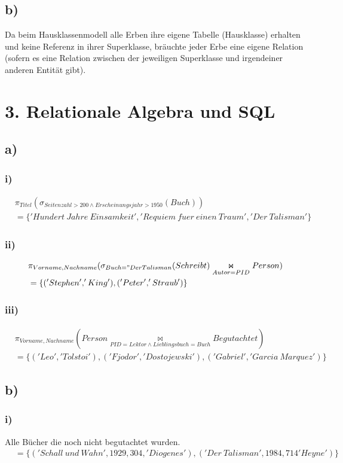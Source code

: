 \documentclass[11pt,german]{article}
\begin{document}
\subsection*{b)}
Da beim Hausklassenmodell alle Erben ihre eigene Tabelle (Hausklasse) erhalten und keine Referenz in ihrer Superklasse, bräuchte jeder Erbe eine eigene Relation (sofern es eine Relation zwischen der jeweiligen Superklasse und irgendeiner anderen Entität gibt).  


\section*{3. Relationale Algebra und SQL}
\subsection*{a)}
\subsubsection*{i)}
\begin{align*}
&\pi_{Titel}(\sigma_{Seitenzahl>200\land Erscheinungsjahr>1950}(Buch))\\
&=\{'Hundert\> Jahre\> Einsamkeit','Requiem\> fuer\> einen\> Traum','Der\> Talisman'\}
\end{align*}

\subsubsection*{ii)}
\begin{align*}
&\pi_{Vorname,Nachname}(\sigma_{Buch="Der Talisman}(Schreibt)\underset{Autor=PID}{\Join}Person)\\
&=\{('Stephen','King'),('Peter','Straub')\}
\end{align*}
\subsubsection*{iii)}
\begin{align*}
&\pi_{Vorname,Nachname}(Person\underset{PID=Lektor\land Lieblingsbuch=Buch}{\Join}Begutachtet)\\
&=\{('Leo','Tolstoi'),('Fjodor','Dostojewski'),('Gabriel','Garcia\> Marquez')\}
\end{align*}
\subsection*{b)}
\subsubsection*{i)}
Alle Bücher die noch nicht begutachtet wurden.
\begin{align*}
&=\{('Schall\> und \> Wahn', 1929, 304, 'Diogenes'),('Der\> Talisman', 1984, 714 'Heyne')\}
\end{align*}
\end{document}
